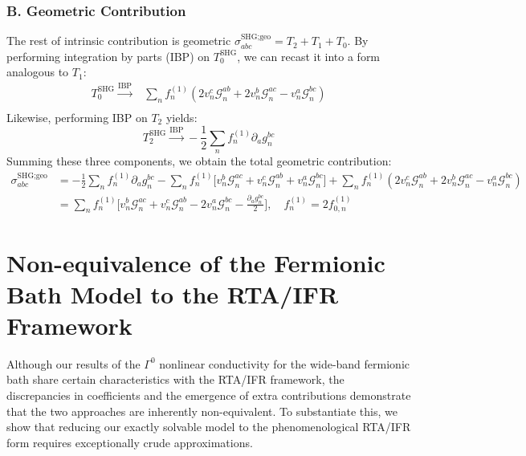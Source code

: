 \documentclass[twocolumn, prx, reprint, amsfonts, amsmath, amssymb, longbibliography, floatfix, aps]{revtex4-2}
\begin{document}
\subsubsection*{B. Geometric Contribution}
The rest of intrinsic contribution is geometric $\sigma^{\text{SHG}; \text{geo}}_{abc} = T_2 + T_1 + T_0$. 
By performing integration by parts (IBP) on $T^{\text{SHG}}_{0}$, we can recast it into a form analogous to $T_1$:
\begin{equation}
	\begin{aligned}
		T^{\text{SHG}}_{0}
		\xrightarrow{\text{IBP}}& {\textstyle \sum_{n}} f^{(1)}_n (2v^c_n\mathcal{G}^{ab}_n + 2v^b_n\mathcal{G}^{ac}_n - v^a_n\mathcal{G}^{bc}_n)\\
	\end{aligned}
\end{equation}
Likewise, performing IBP on $T_2$ yields:
\begin{equation}
	T^{\text{SHG}}_{2}
	\xrightarrow{\text{IBP}} -\frac{1}{2}{\textstyle \sum_{n}} f^{(1)}_n \partial_{a}g^{bc}_n
\end{equation}
Summing these three components, we obtain the total geometric contribution:
\begin{equation}
	\begin{aligned}
		\sigma^{\text{SHG}; \text{geo}}_{abc} &= -\frac{1}{2}{\textstyle \sum_{n}} f^{(1)}_n \partial_{a}g^{bc}_n -{\textstyle \sum_{n}} f^{(1)}_n \Big[v^b_{n} \mathcal{G}^{ac}_{n}  + v^c_{n} \mathcal{G}^{ab}_{n} + v^a_{n} \mathcal{G}^{bc}_{n} \Big] + {\textstyle \sum_{n}} f^{(1)}_n (2v^c_n\mathcal{G}^{ab}_n + 2v^b_n\mathcal{G}^{ac}_n - v^a_n\mathcal{G}^{bc}_n)\\
		&= {\textstyle \sum_{n}} f^{(1)}_n \Big[v^b_{n} \mathcal{G}^{ac}_{n}  + v^c_{n} \mathcal{G}^{ab}_{n} - 2v^a_{n} \mathcal{G}^{bc}_{n}  - \frac{\partial_a g^{bc}_n}{2}\Big],
        \quad
        f_n^{(1)} = 2 f_{0,n}^{(1)}
	\end{aligned}
\end{equation}









\section{Non-equivalence of the Fermionic Bath Model to the RTA/IFR Framework}

Although our results of the $\Gamma^0$ nonlinear conductivity for the wide-band fermionic bath share certain characteristics with the RTA/IFR framework, the discrepancies in coefficients and the emergence of extra contributions demonstrate that the two approaches are inherently non-equivalent. To substantiate this, we show that reducing our exactly solvable model to the phenomenological RTA/IFR form requires exceptionally crude  approximations. 
\end{document}
